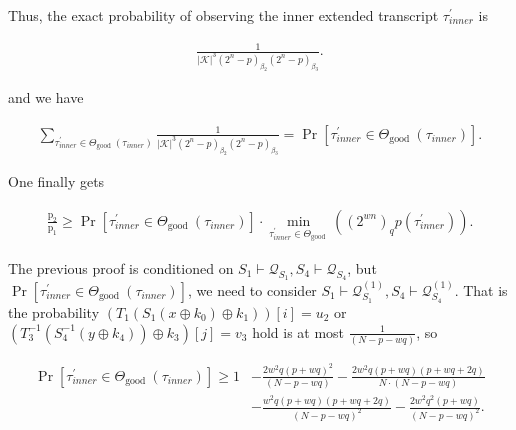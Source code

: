 Thus, the exact probability of observing the inner extended transcript $\tau_{inner}^{\prime}$ is

$$
\begin{aligned}
\frac{1}{|\mathcal{K}|^{3}\left(2^{n}-p\right)_{\beta_{2}}\left(2^{n}-p\right)_{\beta_{3}}}.
\end{aligned}
$$

and we have

$$
\begin{aligned}
\sum_{\tau_{inner}^{\prime} \in \Theta_{\text {good }}(\tau_{inner})} \frac{1}{|\mathcal{K}|^{3}\left(2^{n}-p\right)_{\beta_{2}}\left(2^{n}-p\right)_{\beta_{3}}} = \operatorname{Pr}\left[ \tau_{inner}^{\prime} \in \Theta_{\text {good }}(\tau_{inner})\right].
\end{aligned}
$$

One finally gets

\begin{equation}
\begin{aligned}
\frac{\mathrm{p}_{2}}{\mathrm{p}_{1}} \geq \operatorname{Pr}\left[ \tau_{inner}^{\prime} \in \Theta_{\text {good }}(\tau_{inner})\right] \cdot \min _{\tau_{inner}^{\prime} \in \Theta_{\text {good }}}((2^{w n})_{q} p(\tau_{inner}^{\prime})).
\end{aligned}
\end{equation}

The previous proof is conditioned on $S_{1} \vdash \mathcal{Q}_{S_{1}}, S_{4} \vdash \mathcal{Q}_{S_{4}}$, but $\operatorname{Pr}\left[ \tau_{inner}^{\prime} \in \Theta_{\text {good }}(\tau_{inner})\right]$, we need to consider $S_{1} \vdash \mathcal{Q}_{S_{1}}^{(1)}, S_{4} \vdash \mathcal{Q}_{S_{4}}^{(1)}$. That is the probability $\left(T_{1}\left(S_{1}\left(x \oplus k_{0}\right) \oplus k_{1}\right)\right)[i]=u_2$ or $\left(T_{3}^{-1}\left(S_{4}^{-1}\left(y \oplus k_{4}\right)\right) \oplus k_{3}\right)[j]=v_3$ hold is at most $\frac{1}{(N-p-w q)}$, so

\begin{equation}
\begin{aligned}
\operatorname{Pr}\left[ \tau_{inner}^{\prime} \in \Theta_{\text {good }}(\tau_{inner})\right] \geq 1&- \frac{2 w^{2} q (p+w q)^{2}}{(N-p-w q)} -\frac{2 w^{2} q (p+w q)(p+w q+2 q)}{N \cdot (N-p-w q)}\\
&- \frac{w^{2} q (p+w q)(p+w q+2 q)}{(N-p-w q)^2} - \frac{2 w^{2} q^{2} (p+w q)}{(N- p- wq)^2}.
\end{aligned}
\end{equation}




